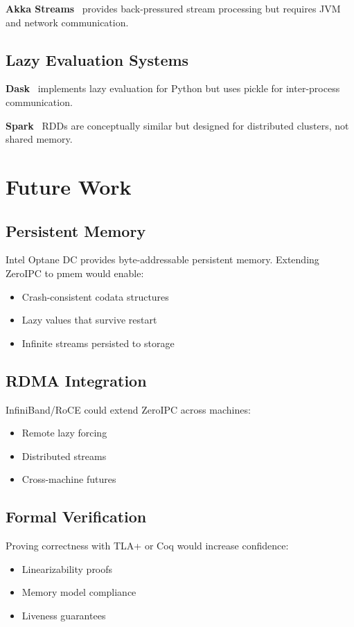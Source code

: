 \documentclass[letterpaper,twocolumn,10pt]{article}
\newcommand{\projectname}{ZeroIPC}
\begin{document}
\textbf{Akka Streams}~\cite{akka} provides back-pressured stream processing but requires JVM and network communication.

\subsection{Lazy Evaluation Systems}

\textbf{Dask}~\cite{dask} implements lazy evaluation for Python but uses pickle for inter-process communication.

\textbf{Spark}~\cite{spark} RDDs are conceptually similar but designed for distributed clusters, not shared memory.

\section{Future Work}

\subsection{Persistent Memory}

Intel Optane DC provides byte-addressable persistent memory. Extending \projectname{} to pmem would enable:
\begin{itemize}
\item Crash-consistent codata structures
\item Lazy values that survive restart
\item Infinite streams persisted to storage
\end{itemize}

\subsection{RDMA Integration}

InfiniBand/RoCE could extend \projectname{} across machines:
\begin{itemize}
\item Remote lazy forcing
\item Distributed streams
\item Cross-machine futures
\end{itemize}

\subsection{Formal Verification}

Proving correctness with TLA+ or Coq would increase confidence:
\begin{itemize}
\item Linearizability proofs
\item Memory model compliance
\item Liveness guarantees
\end{itemize}
\end{document}
